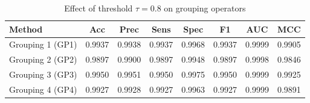\begin{table}[htbp]
\centering
\caption{Effect of threshold $\tau = 0.8$ on grouping operators}
\label{tab:t1_tau08}
\begin{tabular}{lccccccc}
\toprule
Method & Acc & Prec & Sens & Spec & F1 & AUC & MCC \\
\midrule
Grouping 1 (GP1) & 0.9937 & 0.9938 & 0.9937 & 0.9968 & 0.9937 & 0.9999 & 0.9905 \\
Grouping 2 (GP2) & 0.9897 & 0.9900 & 0.9897 & 0.9948 & 0.9897 & 0.9998 & 0.9846 \\
Grouping 3 (GP3) & 0.9950 & 0.9951 & 0.9950 & 0.9975 & 0.9950 & 0.9999 & 0.9925 \\
Grouping 4 (GP4) & 0.9927 & 0.9928 & 0.9927 & 0.9963 & 0.9927 & 0.9999 & 0.9891 \\
\bottomrule
\end{tabular}
\end{table}